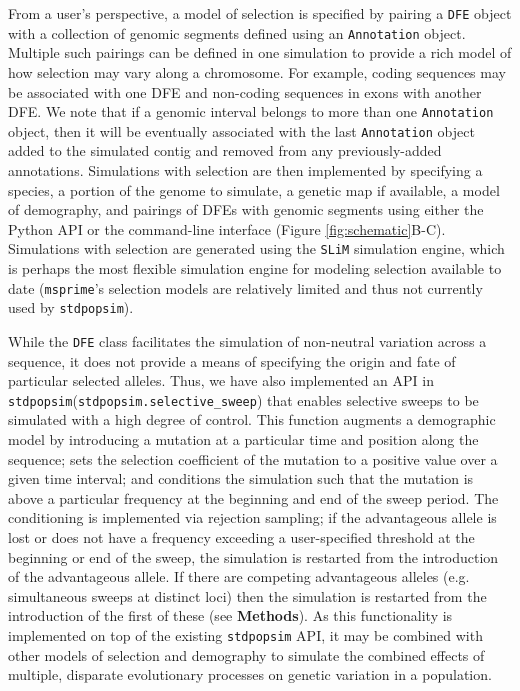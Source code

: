 \documentclass[hidelinks]{article}
\newcommand{\stdpopsim}{\texttt{stdpopsim}\xspace}
\newcommand{\slim}{\texttt{SLiM}\xspace}
\newcommand{\msprime}{\texttt{msprime}\xspace}
\begin{document}
    From a user's perspective, a model of selection is specified by pairing a \texttt{DFE} object
    with a collection of genomic segments defined using an \texttt{Annotation} object.
    Multiple such pairings can be defined in one simulation
    to provide a rich model of how selection may vary along a chromosome.
    For example, coding sequences may be associated with one DFE and non-coding sequences in exons with another DFE. 
    We note that if a genomic interval belongs to more than one \texttt{Annotation} object,
    then it will be eventually associated with the last \texttt{Annotation} object added
    to the simulated contig and removed from any previously-added annotations. 
    Simulations with selection are then implemented by specifying a species,
    a portion of the genome to simulate,
    a genetic map if available, a model of demography, and pairings of DFEs with genomic segments
    using either the Python API or the command-line interface (Figure \ref{fig:schematic}B-C).
    Simulations with selection are generated
    using the \slim simulation engine, which is perhaps
    the most flexible simulation engine for modeling selection available to date
    (\msprime's selection models are relatively limited and thus not currently used by \stdpopsim).

    While the \texttt{DFE} class facilitates the simulation of non-neutral
    variation across a sequence, it does not provide a means of specifying the
    origin and fate of particular selected alleles.  Thus, we have also
    implemented an API in \stdpopsim (\texttt{stdpopsim.selective\_sweep}) that
    enables selective sweeps to be simulated with a high degree of control.
    This function augments a demographic model by introducing a mutation at a
    particular time and position along the sequence; sets the selection
    coefficient of the mutation to a positive value over a given time interval;
    and conditions the simulation such that the mutation is above a particular
    frequency at the beginning and end of the sweep period.  The conditioning 
    is implemented via rejection sampling; if the advantageous allele is lost
    or does not have a frequency exceeding a user-specified threshold at the
    beginning or end of the sweep, the simulation is restarted from the
    introduction of the advantageous allele.  If there are competing
    advantageous alleles (e.g.  simultaneous sweeps at distinct loci) then the
    simulation is restarted from the introduction of the first of these (see \textbf{Methods}).  As
    this functionality is implemented on top of the existing \stdpopsim API, it
    may be combined with other models of selection and demography to simulate
    the combined effects of multiple, disparate evolutionary processes on
    genetic variation in a population.
\end{document}
